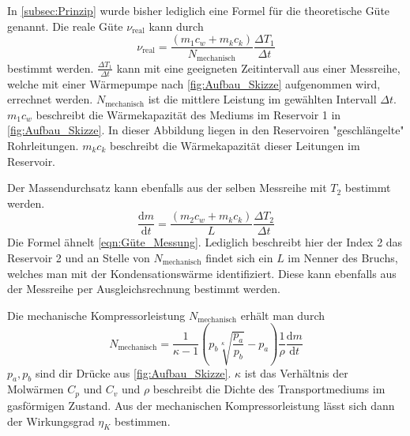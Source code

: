 In \autoref{subsec:Prinzip} wurde bisher lediglich eine Formel für die theoretische Güte genannt. Die reale Güte $\nu_{\text{real}}$ kann durch 
\begin{equation}
    \label{eqn:Güte_Messung}
    \nu_{\text{real}} = \frac{\left(m_1 c_w + m_k c_k\right)}{N_{\text{mechanisch}}}\frac{\Delta T_1}{\Delta t}
\end{equation}
bestimmt werden. $\frac{\Delta T_1}{\Delta t}$ kann mit eine geeigneten Zeitintervall aus einer Messreihe, welche mit einer Wärmepumpe nach \autoref{fig:Aufbau_Skizze} aufgenommen wird,
errechnet werden. $N_{\text{mechanisch}}$ ist die mittlere Leistung im gewählten Intervall $\Delta t$. $m_1c_w$ beschreibt die Wärmekapazität des Mediums im Reservoir 1 in \autoref{fig:Aufbau_Skizze}. In dieser Abbildung 
liegen in den Reservoiren "geschlängelte"\: Rohrleitungen. $m_kc_k$ beschreibt die Wärmekapazität dieser Leitungen im Reservoir. 


Der Massendurchsatz kann ebenfalls aus der selben Messreihe mit $T_2$ bestimmt werden. 
\begin{equation}
    \label{eqn:Massendurchsatz}
    \frac{\text{d}m}{\text{d}t} = \frac{\left(m_2 c_w + m_k c_k\right)}{L}\frac{\Delta T_2}{\Delta t}
\end{equation}
Die Formel ähnelt \autoref{eqn:Güte_Messung}. Lediglich beschreibt hier der Index 2 das Reservoir 2 und an Stelle von $N_{\text{mechanisch}}$ findet sich ein $L$ 
im Nenner des Bruchs, welches man mit der Kondensationswärme identifiziert.
Diese kann ebenfalls aus der Messreihe per Ausgleichsrechnung bestimmt werden.


Die mechanische Kompressorleistung $N_{\text{mechanisch}}$ erhält man durch
\begin{equation}
    \label{eqn:Leistung}
    N_{\text{mechanisch}} = \frac{1}{\kappa - 1}\left(p_b \sqrt[\kappa]{\frac{p_a}{p_b}} - p_a \right) \frac{1}{\rho} \frac{\text{d}m}{\text{d}t}
\end{equation}
$p_a, p_b$ sind dir Drücke aus \autoref{fig:Aufbau_Skizze}. $\kappa$ ist das Verhältnis der Molwärmen $C_p$ und $C_v$ und $\rho$ beschreibt die Dichte des Transportmediums im gasförmigen
Zustand. Aus der mechanischen Kompressorleistung lässt sich dann der Wirkungsgrad $\eta_K$ bestimmen.